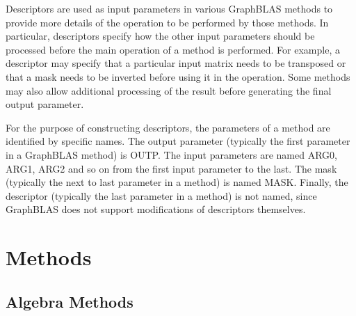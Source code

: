 \documentclass[11pt]{extarticle}
\begin{document}
Descriptors are used as input parameters in various GraphBLAS methods to
provide more details of the operation to be performed by those methods.
In particular, descriptors specify how the other input parameters
should be processed before the main operation of a method is performed.
For example, a descriptor may specify that a particular input matrix
needs to be transposed or that a mask needs to be inverted before using
it in the operation. Some methods may also allow additional processing
of the result before generating the final output parameter.


For the purpose of constructing descriptors, the parameters of a method
are identified by specific names. The output parameter (typically
the first parameter in a GraphBLAS method) is {\sf OUTP}.  The input
parameters are named {\sf ARG0}, {\sf ARG1}, {\sf ARG2} and so on from
the first input parameter to the last. The mask (typically the next to
last parameter in a method) is named {\sf MASK}. Finally, the descriptor
(typically the last parameter in a method) is not named, since GraphBLAS
does not support modifications of descriptors themselves.




\section{Methods}
\label{Sec:Methods}

\subsection{Algebra Methods}
\end{document}

